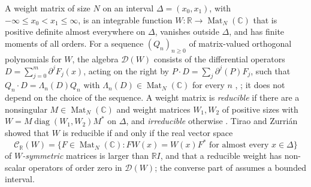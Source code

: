 \documentclass[11pt]{amsart}
\theoremstyle{definition}
\theoremstyle{remark}
\numberwithin{equation}{section}
\newcommand{\C}{\mathbb{C}}
\newcommand{\R}{\mathbb{R}}
\newcommand{\Mat}{\operatorname{Mat}}
\newcommand{\diag}{\operatorname{diag}}
\newcommand{\cD}{\mathcal{D}}
\newcommand{\CR}{\mathcal{C}_{\R}}
\begin{document}
A weight matrix of size $N$ on an interval $\Delta=(x_0,x_1)$, with
$-\infty\le x_0<x_1\le\infty$, is an integrable function
$W\colon\R\to\Mat_N(\C)$ that is positive definite almost everywhere on
$\Delta$, vanishes outside $\Delta$, and has finite moments of all orders.
For a sequence $(Q_n)_{n\ge0}$ of matrix-valued orthogonal polynomials for
$W$, the algebra $\cD(W)$ consists of the differential operators
$D=\sum_{j=0}^m\partial^jF_j(x)$, acting on the right by
$P\cdot D=\sum_j\partial^j(P)F_j$, such that
$Q_n\cdot D=\Lambda_n(D)Q_n$ with $\Lambda_n(D)\in\Mat_N(\C)$ for every $n$
\cite{GT07}, \cite[Definition~2.2]{BP26}; it does not depend on the choice
of the sequence. A weight matrix is \emph{reducible} if there are a
nonsingular $M\in\Mat_N(\C)$ and weight matrices $W_1,W_2$ of positive sizes
with $W=M\diag(W_1,W_2)M^*$ on $\Delta$, and \emph{irreducible} otherwise
\cite[Definition~2.4]{BP26}. Tirao and Zurri\'an \cite{TZ18} showed that $W$
is reducible if and only if the real vector space
\[
\CR(W)=\{F\in\Mat_N(\C)\colon FW(x)=W(x)F^*\text{ for almost every }x\in\Delta\}
\]
of \emph{$W$-symmetric} matrices is larger than $\R I$, and that a reducible
weight has non-scalar operators of order zero in $\cD(W)$; the converse part
of \cite[Theorem~4.3]{TZ18} assumes a bounded interval.
\end{document}
